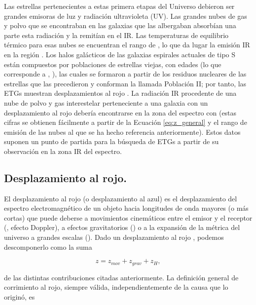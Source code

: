 Las estrellas pertenecientes a estas primera etapas del Universo debieron ser grandes emisoras de luz y radiación ultravioleta (UV). Las grandes nubes de gas y polvo que se encontraban en las galaxias que las albergaban absorbían una parte esta radiación y la remitían en el IR. Las temperaturas de equilibrio térmico para esas nubes se encuentran el rango de , lo que da lugar la emisión IR en la región  \citep{book:encyclopedia}.
Los halos galácticos de las galaxias espirales actuales de tipo S están compuestos por poblaciones de estrellas viejas, con edades  (lo que corresponde a , \citealt{article:Lapi_2011}), las cuales se formaron a partir de los residuos nucleares de las estrellas que las precedieron y conforman la llamada Población II; por tanto, las ETGs muestran desplazamientos al rojo . La radiación IR procedente de una nube de polvo y gas interestelar perteneciente a una galaxia con un desplazamiento al rojo  debería encontrarse en la zona del espectro con  (estas cifras se obtienen fácilmente a partir de la Ecuación \ref{eq:z_general} y el rango de emisión de las nubes al que se ha hecho referencia anteriormente). Estos datos suponen un punto de partida para la búsqueda de ETGs a partir de su observación en la zona IR del espectro.

\subsection{Desplazamiento al rojo.}

El desplazamiento al rojo (o desplazamiento al azul) es el desplazamiento del espectro electromagnético de un objeto hacia longitudes de onda mayores (o más cortas) que puede deberse a movimientos cinemáticos entre el emisor y el receptor (, efecto Doppler), a efectos gravitatorios () o a la expansión de la métrica del universo a grandes escalas (). Dado un desplazamiento al rojo , podemos descomponerlo como la suma

\begin{equation}\label{eq:z_descomposicion}
    z= {z}_{mov}+{z}_{grav}+{z}_{H},
\end{equation}

de las distintas contribuciones citadas anteriormente. La definición general de corrimiento al rojo, siempre válida, independientemente de la causa que lo originó, es

